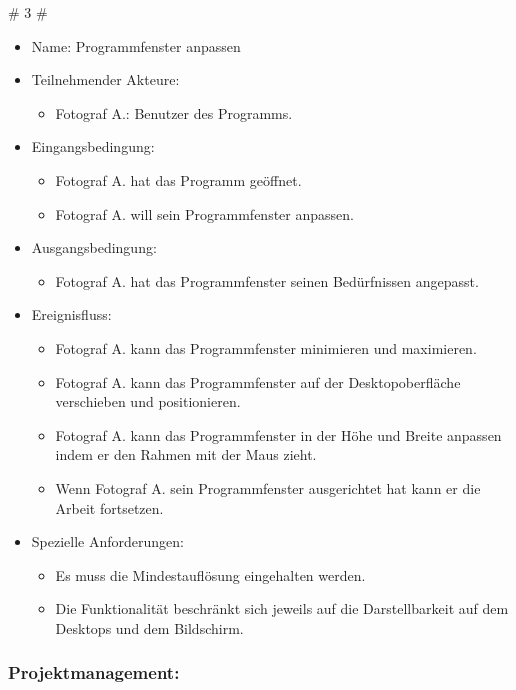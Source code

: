 	\# 3 \#
	\begin{itemize}
		\item Name: Programmfenster anpassen
		\item Teilnehmender Akteure:
		\begin{itemize}
			\item	Fotograf A.: Benutzer des Programms.
		\end{itemize}
		\item Eingangsbedingung:
		\begin{itemize}
			\item Fotograf A. hat das Programm geöffnet.
			\item Fotograf A. will sein Programmfenster anpassen.						
		\end{itemize}
		\item Ausgangsbedingung:
		\begin{itemize}
			\item	Fotograf A. hat das Programmfenster seinen Bedürfnissen angepasst.		
		\end{itemize}
		\item Ereignisfluss:	
		\begin{itemize}
			\item Fotograf A. kann das Programmfenster minimieren und maximieren.
			\item Fotograf A. kann das Programmfenster auf der Desktopoberfläche verschieben und positionieren.
			\item Fotograf A. kann das Programmfenster in der Höhe und Breite anpassen indem er den Rahmen mit der Maus zieht.
			\item Wenn Fotograf A. sein Programmfenster ausgerichtet hat kann er die Arbeit fortsetzen.
		\end{itemize}
		\item Spezielle Anforderungen:
		\begin{itemize}
			\item	Es muss die Mindestauflösung eingehalten werden.
			\item Die Funktionalität beschränkt sich jeweils auf die Darstellbarkeit auf dem Desktops und dem Bildschirm.
		\end{itemize}
	\end{itemize}
		
	
	\subsubsection{Projektmanagement:}
		
